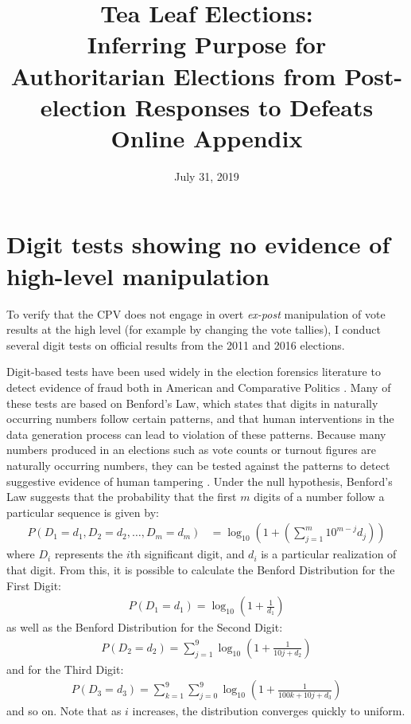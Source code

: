 \documentclass[12pt]{article}
\title{Tea Leaf Elections: \\
	Inferring Purpose for Authoritarian Elections from Post-election Responses to Defeats \\
	\vspace{2ex}
	Online Appendix}
\date{July 31, 2019}
\newcommand{\1}{\mathbbm{1}}
\renewcommand\r{\right}
\renewcommand\l{\left}
\begin{document}
	

\maketitle
\thispagestyle{empty}


\doublespacing

\newpage
{}

\tableofcontents
\newpage

\appendix

\section{Digit tests showing no evidence of high-level manipulation}
\label{app:benford}
To verify that the CPV does not engage in overt \textit{ex-post} manipulation of vote results at the high level (for example by changing the vote tallies), I conduct several digit tests on official results from the 2011 and 2016 elections. 

Digit-based tests have been used widely in the election forensics literature to detect evidence of fraud both in American \citep{Mebane2006} and Comparative Politics \citep{Mebane2009, Beber2012}. Many of these tests are based on Benford's Law, which states that digits in naturally occurring numbers follow certain patterns, and that human interventions in the data generation process can lead to violation of these patterns. Because many numbers produced in an elections such as vote counts or turnout figures are naturally occurring numbers, they can be tested against the patterns to detect suggestive evidence of human tampering \citep{Mebane2006}. Under the null hypothesis, Benford's Law suggests that the probability that the first $m$ digits of a number follow a particular sequence is given by:
\begin{align*}
P(D_1=d_1, D_2=d_2, \dots, D_m=d_m) &= \log_{10}\l(1 + \l( \sum_{j=1}^{m}10^{m-j}d_j\r)\r)
\end{align*}
where $D_i$ represents the $i$th significant digit, and $d_i$ is a particular realization of that digit. From this, it is possible to calculate the Benford Distribution for the First Digit:
\begin{align*}
P(D_1=d_1) = \log_{10}\l(1 + \frac{1}{d_1}\r)
\end{align*}
as well as the Benford Distribution for the Second Digit:
\begin{align*}
P(D_2=d_2) = \sum_{j=1}^{9}\log_{10}\l(1 + \frac{1}{10j + d_2}\r)
\end{align*}
and for the Third Digit:
\begin{align*}
P(D_3=d_3) = \sum_{k=1}^{9}\sum_{j=0}^{9}\log_{10}\l(1 + \frac{1}{100k + 10j + d_3}\r)
\end{align*}
and so on. Note that as $i$ increases, the distribution converges quickly to uniform.
\end{document}
